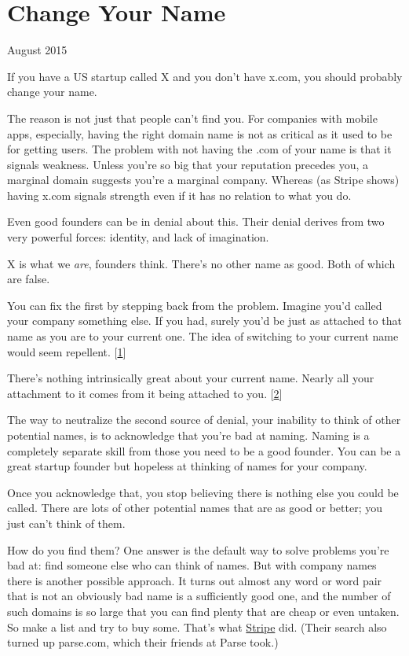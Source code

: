\chapter{Change Your Name}



August 2015

If you have a US startup called X and you don't have x.com, you
should probably change your name.

The reason is not just that people can't find you.  For companies
with mobile apps, especially, having the right domain name is not
as critical as it used to be for getting users.  The problem with
not having the .com of your name is that it signals weakness.  Unless
you're so big that your reputation precedes you, a marginal domain
suggests you're a marginal company.  Whereas
(as Stripe shows)
having x.com signals strength even if it has no relation to what you
do.

Even good founders can be in denial about this.  Their denial derives
from two very powerful forces: identity, and lack of imagination.

X is what we \emph{are}, founders think. There's no other name as good.
Both of which are false.

You can fix the first by stepping back from the problem. Imagine
you'd called your company something else.  If you had, surely you'd
be just as attached to that name as you are to your current one.
The idea of switching to your current name would seem repellent.
[\href{\#f1n}{1}]

There's nothing intrinsically great about your current name.  Nearly
all your attachment to it comes from it being attached to you.
[\href{\#f1n}{2}]

The way to neutralize the second source of denial, your inability
to think of other potential names, is to acknowledge that you're
bad at naming.  Naming is a completely separate skill from those
you need to be a good founder.  You can be a great startup founder
but hopeless at thinking of names for your company.

Once you acknowledge that, you stop believing there is nothing else
you could be called.  There are lots of other potential names that
are as good or better; you just can't think of them.

How do you find them? One answer is the default way to solve
problems you're bad at: find someone else who can think of names.
But with company names there is another possible
approach.  It turns out almost any word or word pair that is not
an obviously bad name is a sufficiently good one, and the number
of such domains is so large that you can find plenty that are cheap
or even untaken.  So make a list and try to buy some.  That's what
\href{http://www.quora.com/How-did-Stripe-come-up-with-its-name?share=1}{Stripe} 
did.  (Their search also turned up parse.com, which their
friends at Parse took.)

